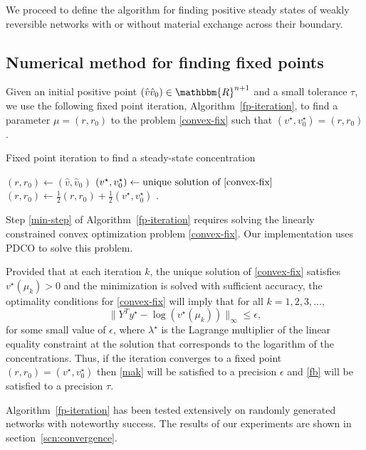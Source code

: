 \documentclass[smallextended]{svjour3}       %
\newcommand*{\0}{\mathbf{0}}
\newcommand*{\1}{\mathbf{1}}
\newcommand*{\R}{\mathbbm{R}}
\begin{document}
We proceed to define the algorithm for finding positive steady states of weakly
reversible networks with or without material exchange across their 
boundary.

\subsection{Numerical method for finding fixed points}

Given an initial positive point $(\hat v \hat v_0) \in \R^{n+1}$ and a small
tolerance $\tau$, we use the following fixed point iteration,
Algorithm~\ref{fp-iteration}, to find a parameter $\mu = (r, r_0)$ to
the problem \eqref{convex-fix} such that $(v^\star,v_0^\star) =
(r,r_0)$.

\begin{algorithm}
\caption{Fixed point iteration to find a steady-state concentration}
\label{fp-iteration}
\begin{algorithmic}[1]
  \STATE $(r,r_0) \gets (\hat v,\hat v_0)$
  \STATE $(v^\star,v^\star_0)\gets \text{unique solution of \eqref{convex-fix}} $
		\label{min-step}
	\STATE $(r,r_0) \gets \frac{1}{2}(r,r_0) +\frac{1}{2}(v^\star,v^\star_0)$
  \ENDWHILE
  \label{fixpoint-alg}.
\end{algorithmic}
\end{algorithm}

Step \ref{min-step} of Algorithm~\ref{fp-iteration} requires
solving the linearly constrained convex optimization problem
\eqref{convex-fix}. Our implementation uses PDCO \cite{pdco} to
solve this problem.

Provided that at each iteration $k$, the unique solution of \eqref{convex-fix}
satisfies $v^\star(\mu_k)>0$ and the minimization is solved with sufficient
accuracy, the optimality conditions for \eqref{convex-fix} will imply that for
all $k = 1, 2, 3, \dots$,
\[
	\|Y^Ty^\star-\log(v^\star(\mu_k))\|_\infty \leq \epsilon,
\] 
for some small value of $\epsilon$, where $\lambda^\star$ is the Lagrange
multiplier of the linear equality constraint at the solution that corresponds
to the logarithm of the concentrations. Thus, if the iteration
converges to a fixed point $(r,r_0) = (v^\star,v_0^\star)$ then
\eqref{mak} will be satisfied to a precision $\epsilon$ and \eqref{fb}
will be satisfied to a precision $\tau$.

Algorithm~\ref{fp-iteration} has been tested extensively on randomly generated
networks with noteworthy success. The results of our experiments are shown in
section~\ref{scn:convergence}.
\end{document}
